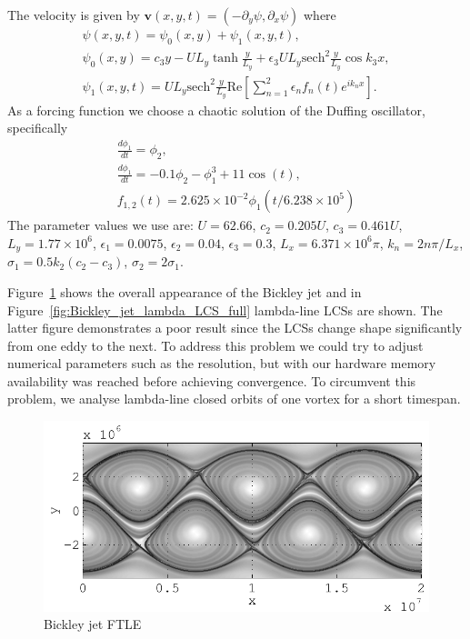 \documentclass{article}
\begin{document}
The velocity is given by $\boldsymbol{v}(x,y,t) = (-\partial_y \psi, \partial_x \psi)$ where
\begin{gather*}
\psi(x,y,t) = \psi_0(x,y) + \psi_1(x,y,t),\\
\psi_0(x,y) = c_3 y - U L_y \tanh\frac{y}{L_y} + \epsilon_3 U L_y \mathrm{sech}^2\frac{y}{L_y} \cos k_3 x,\\
\psi_1(x,y,t) = U L_y \mathrm{sech}^2\frac{y}{L_y} \mathrm{Re}\left[ \sum_{n=1}^2 \epsilon_n f_n(t) e^{i k_n x}\right].
\end{gather*}
As a forcing function we choose a chaotic solution of the Duffing oscillator, specifically
\begin{gather*}
\frac{d \phi_1}{dt} = \phi_2,\\
\frac{d \phi_1}{dt} = -0.1 \phi_2 - \phi_1^3 + 11 \cos(t),\\
f_{1,2}(t) = 2.625 \times 10^{-2} \phi_1(t/6.238 \times 10^5)
\end{gather*}
The parameter values we use are: $U = 62.66$, $c_2 = 0.205 U$, $c_3 = 0.461 U$, $L_y = 1.77 \times 10^6$, $\epsilon_1 = 0.0075$, $\epsilon_2 = 0.04$, $\epsilon_3 = 0.3$, $L_x = 6.371 \times 10^6 \pi$, $k_n = 2 n \pi/L_x$, $\sigma_1 = 0.5 k_2 (c_2 - c_3)$, $\sigma_2 = 2 \sigma_1$.

Figure~\ref{fig:Bickley_jet_FTLE} shows the overall appearance of the Bickley jet and in Figure~\ref{fig:Bickley_jet_lambda_LCS_full} lambda-line LCSs are shown. The latter figure demonstrates a poor result since the LCSs change shape significantly from one eddy to the next. To address this problem we could try to adjust numerical parameters such as the resolution, but with our hardware memory availability was reached before achieving convergence. To circumvent this problem, we analyse lambda-line closed orbits of one vortex for a short timespan.

\begin{figure}
  \centering
  \includegraphics[width=.85\textwidth]{graphics/bickley_jet/ftle_overview}
  \caption{Bickley jet FTLE}
  \label{fig:Bickley_jet_FTLE}
\end{figure}
\end{document}
